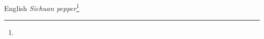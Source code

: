 \begin{etymology}\label{ety:Sichuan pepper}
English \textit{Sichuan pepper}\footnote{}
\end{etymology}